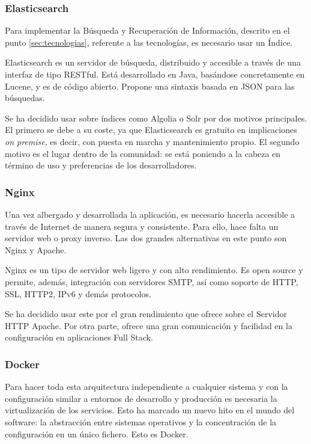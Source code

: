 \subsubsection{Elasticsearch}

Para implementar la Búsqueda y Recuperación de Información, descrito en el punto \ref{sec:tecnologias}, referente a las tecnologías, es necesario usar un Índice.

Elasticsearch es un servidor de búsqueda, distribuido y accesible a través de una interfaz de tipo RESTful. Está desarrollado en Java, basándose concretamente en Lucene, y es de código abierto. Propone una sintaxis basada en JSON para las búsquedas.

Se ha decidido usar sobre índices como Algolia o Solr por dos motivos principales. El primero se debe a su coste, ya que Elasticsearch es gratuito en implicaciones \textit{on premise}, es decir, con puesta en marcha y mantenimiento propio. El segundo motivo es el lugar dentro de la comunidad: se está poniendo a la cabeza en término de uso y preferencias de los desarrolladores.

\subsubsection{Nginx}

Una vez albergado y desarrollada la aplicación, es necesario hacerla accesible a través de Internet de manera segura y consistente. Para ello, hace falta un servidor web o proxy inverso. Las dos grandes alternativas en este punto son Nginx y Apache.

Nginx es un tipo de servidor web ligero y con alto rendimiento. Es open source y permite, además, integración con servidores SMTP, así como soporte de HTTP, SSL, HTTP2, IPv6 y demás protocolos.

Se ha decidido usar este por el gran rendimiento que ofrece sobre el Servidor HTTP Apache. Por otra parte, ofrece una gran comunicación y facilidad en la configuración en aplicaciones Full Stack.

\subsubsection{Docker}

Para hacer toda esta arquitectura independiente a cualquier sistema y con la configuración similar a entornos de desarrollo y producción es necesaria la virtualización de los servicios. Esto ha marcado un nuevo hito en el mundo del software: la abstracción entre sistemas operativos y la concentración de la configuración en un único fichero. Esto es Docker.

